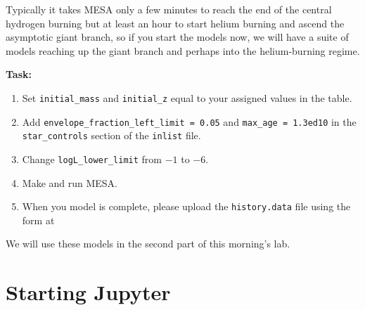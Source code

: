 \documentclass{article}
\begin{document}
Typically it takes MESA only a few minutes to reach the end of the central hydrogen burning but at least an hour to start helium burning and ascend the asymptotic giant branch, so if you start the models now, we will have a suite of models reaching up the giant branch and perhaps into the helium-burning regime.

{\bf Task:}
\begin{enumerate}
 \setlength\itemsep{0em}
    \item 
Set \texttt{initial\_mass} and \texttt{initial\_z} equal to your assigned values in the table.  
\item Add  \texttt{envelope\_fraction\_left\_limit = 0.05} and  \texttt{max\_age = 1.3ed10} in the \texttt{star\_controls} section of the \texttt{inlist} file.
\item Change \texttt{logL\_lower\_limit} from $-1$ to $-6$.
\item Make and run MESA.
\item When you model is complete, please upload the \texttt{history.data} file using the form at

\end{enumerate}
We will use these models in the second part of this morning's lab.

\section{Starting Jupyter}
\end{document}
